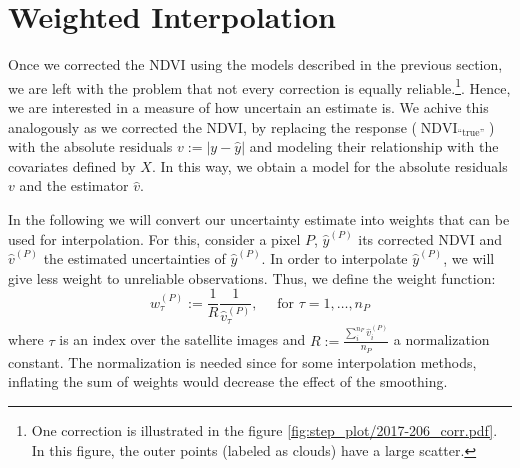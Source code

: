 \section{Weighted Interpolation}{
    \label{sec:corr_uncertainty}
    Once we corrected the NDVI using the models described in the previous section, we are left with the problem that not every correction is equally reliable.\footnote{One correction is illustrated in the figure \ref{fig:step_plot/2017-206_corr.pdf}. In this figure, the outer points (labeled as clouds) have a large scatter.}. Hence, we are interested in a measure of how uncertain an estimate is. 
    We achive this analogously as we corrected the NDVI, by replacing the response ($\operatorname{NDVI}_\text{``true''}$) with the absolute residuals $v := \left|y -\hat y\right|$ and modeling their relationship with the covariates defined by $X$.  In this way, we obtain a model for the absolute residuals $v$ and the estimator $\hat v$. 
    
    \label{sec:corr_link}
    In the following we will convert our uncertainty estimate into weights that can be used for interpolation. For this, consider a pixel $P$, $\hat y^{(P)}$ its corrected NDVI and $\hat v^{(P)}$ the estimated uncertainties of $\hat y^{(P)}$. In order to interpolate $\hat y^{(P)}$, we will give less weight to unreliable observations. Thus, we define the weight function: 
    \begin{equation}
        \label{eq:corr_link}
        w^{(P)}_\tau:=\frac{1}{R} \frac{1}{\hat v^{(P)}_\tau}, 
        \quad \text{ for } \tau=1,\dots, n_P
    \end{equation}  
    where $\tau$ is an index over the satellite images and $R:=\frac{\sum_i^{n_P}\hat v^{(P)}_i}{n_P}$ a normalization constant. The normalization is needed since for some interpolation methods, inflating the sum of weights would decrease the effect of the smoothing. 
}


